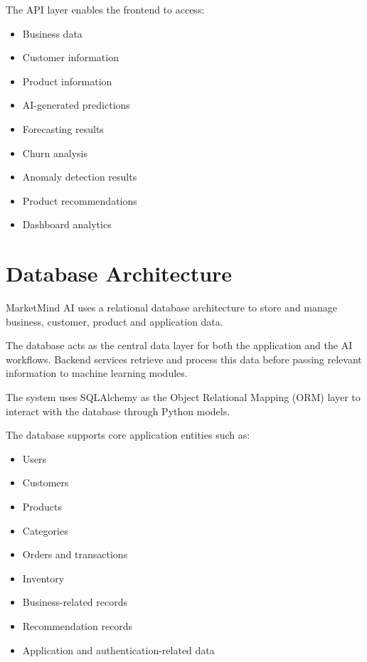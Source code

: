 \documentclass[12pt,a4paper]{report}
\begin{document}
The API layer enables the frontend to access:

\begin{itemize}[leftmargin=1.2cm]
    \item Business data
    \item Customer information
    \item Product information
    \item AI-generated predictions
    \item Forecasting results
    \item Churn analysis
    \item Anomaly detection results
    \item Product recommendations
    \item Dashboard analytics
\end{itemize}



\section{Database Architecture}

MarketMind AI uses a relational database architecture to store and
manage business, customer, product and application data.

The database acts as the central data layer for both the application and
the AI workflows. Backend services retrieve and process this data before
passing relevant information to machine learning modules.

The system uses SQLAlchemy as the Object Relational Mapping (ORM) layer
to interact with the database through Python models.

The database supports core application entities such as:

\begin{itemize}[leftmargin=1.2cm]
    \item Users
    \item Customers
    \item Products
    \item Categories
    \item Orders and transactions
    \item Inventory
    \item Business-related records
    \item Recommendation records
    \item Application and authentication-related data
\end{itemize}
\end{document}
